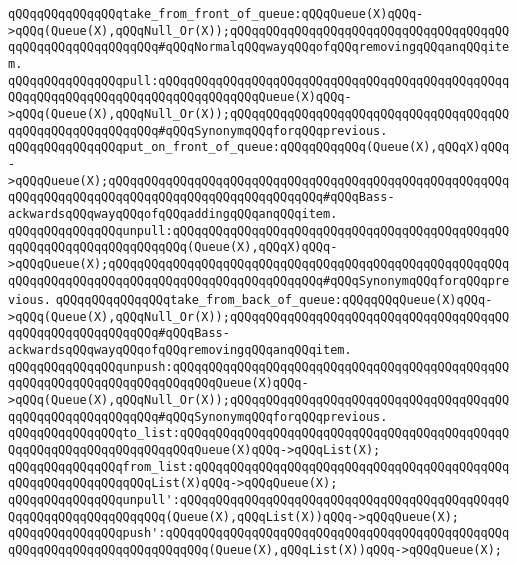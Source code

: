 \newline
\verb|qQQqqQQqqQQqqQQqtake_from_front_of_queue:qQQqQueue(X)qQQq->qQQq(Queue(X),qQQqNull_Or(X));qQQqqQQqqQQqqQQqqQQqqQQqqQQqqQQqqQQqqQQqqQQqqQQqqQQqqQQqqQQq#qQQqNormalqQQqwayqQQqofqQQqremovingqQQqanqQQqitem.|\newline
\verb|qQQqqQQqqQQqqQQqpull:qQQqqQQqqQQqqQQqqQQqqQQqqQQqqQQqqQQqqQQqqQQqqQQqqQQqqQQqqQQqqQQqqQQqqQQqqQQqqQQqqQQqQueue(X)qQQq->qQQq(Queue(X),qQQqNull_Or(X));qQQqqQQqqQQqqQQqqQQqqQQqqQQqqQQqqQQqqQQqqQQqqQQqqQQqqQQqqQQq#qQQqSynonymqQQqforqQQqprevious.|\newline
\newline
\verb|qQQqqQQqqQQqqQQqput_on_front_of_queue:qQQqqQQqqQQq(Queue(X),qQQqX)qQQq->qQQqQueue(X);qQQqqQQqqQQqqQQqqQQqqQQqqQQqqQQqqQQqqQQqqQQqqQQqqQQqqQQqqQQqqQQqqQQqqQQqqQQqqQQqqQQqqQQqqQQqqQQqqQQq#qQQqBass-ackwardsqQQqwayqQQqofqQQqaddingqQQqanqQQqitem.|\newline
\verb|qQQqqQQqqQQqqQQqunpull:qQQqqQQqqQQqqQQqqQQqqQQqqQQqqQQqqQQqqQQqqQQqqQQqqQQqqQQqqQQqqQQqqQQqqQQq(Queue(X),qQQqX)qQQq->qQQqQueue(X);qQQqqQQqqQQqqQQqqQQqqQQqqQQqqQQqqQQqqQQqqQQqqQQqqQQqqQQqqQQqqQQqqQQqqQQqqQQqqQQqqQQqqQQqqQQqqQQqqQQq#qQQqSynonymqQQqforqQQqprevious.|\newline
\newline
\verb|qQQqqQQqqQQqqQQqtake_from_back_of_queue:qQQqqQQqQueue(X)qQQq->qQQq(Queue(X),qQQqNull_Or(X));qQQqqQQqqQQqqQQqqQQqqQQqqQQqqQQqqQQqqQQqqQQqqQQqqQQqqQQqqQQq#qQQqBass-ackwardsqQQqwayqQQqofqQQqremovingqQQqanqQQqitem.|\newline
\verb|qQQqqQQqqQQqqQQqunpush:qQQqqQQqqQQqqQQqqQQqqQQqqQQqqQQqqQQqqQQqqQQqqQQqqQQqqQQqqQQqqQQqqQQqqQQqqQQqQueue(X)qQQq->qQQq(Queue(X),qQQqNull_Or(X));qQQqqQQqqQQqqQQqqQQqqQQqqQQqqQQqqQQqqQQqqQQqqQQqqQQqqQQqqQQq#qQQqSynonymqQQqforqQQqprevious.|\newline
\newline
\verb|qQQqqQQqqQQqqQQqto_list:qQQqqQQqqQQqqQQqqQQqqQQqqQQqqQQqqQQqqQQqqQQqqQQqqQQqqQQqqQQqqQQqqQQqqQQqQueue(X)qQQq->qQQqList(X);|\newline
\verb|qQQqqQQqqQQqqQQqfrom_list:qQQqqQQqqQQqqQQqqQQqqQQqqQQqqQQqqQQqqQQqqQQqqQQqqQQqqQQqqQQqqQQqList(X)qQQq->qQQqQueue(X);|\newline
\newline
\verb|qQQqqQQqqQQqqQQqunpull':qQQqqQQqqQQqqQQqqQQqqQQqqQQqqQQqqQQqqQQqqQQqqQQqqQQqqQQqqQQqqQQqqQQq(Queue(X),qQQqList(X))qQQq->qQQqQueue(X);|\newline
\verb|qQQqqQQqqQQqqQQqpush':qQQqqQQqqQQqqQQqqQQqqQQqqQQqqQQqqQQqqQQqqQQqqQQqqQQqqQQqqQQqqQQqqQQqqQQqqQQq(Queue(X),qQQqList(X))qQQq->qQQqQueue(X);|\newline
